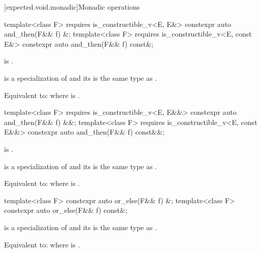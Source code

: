 [expected.void.monadic]{Monadic operations}

%
\begin{itemdecl}
template<class F>
  requires is_constructible_v<E, E&>
constexpr auto and_then(F&& f) &;
template<class F>
  requires is_constructible_v<E, const E&>
constexpr auto and_then(F&& f) const&;
\end{itemdecl}

\begin{itemdescr}
\pnum
\constraints
{} is .

\pnum
\mandates
{} is a specialization of  and its  is the same type as .

\pnum
\effects
Equivalent to:  where  is .
\end{itemdescr}

%
\begin{itemdecl}
template<class F>
  requires is_constructible_v<E, E&&>
constexpr auto and_then(F&& f) &&;
template<class F>
  requires is_constructible_v<E, const E&&>
constexpr auto and_then(F&& f) const&&;
\end{itemdecl}

\begin{itemdescr}
\pnum
\constraints
{} is .

\pnum
\mandates
{} is a specialization of  and its  is the same type as .

\pnum
\effects
Equivalent to:  where  is .
\end{itemdescr}

%
\begin{itemdecl}
template<class F> constexpr auto or_else(F&& f) &;
template<class F> constexpr auto or_else(F&& f) const&;
\end{itemdecl}

\begin{itemdescr}
\pnum
\mandates
{} is a specialization of  and its  is the same type as .

\pnum
\effects
Equivalent to:  where  is .
\end{itemdescr}

